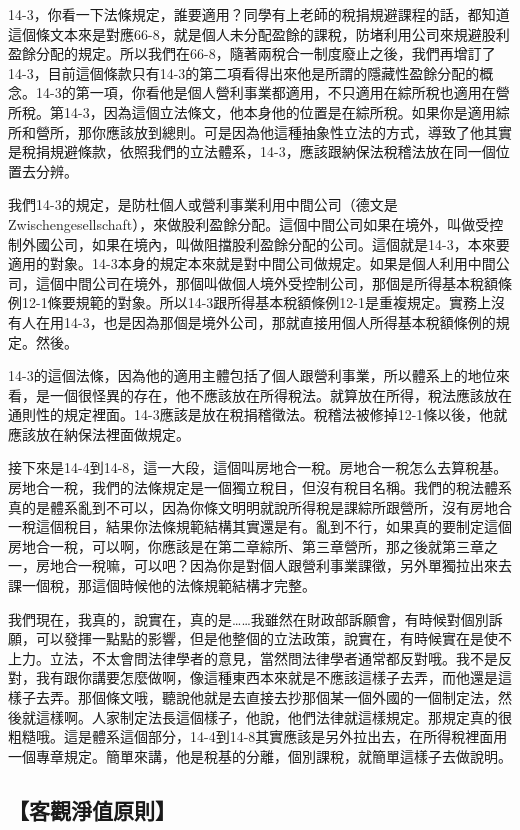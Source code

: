 \documentclass[oneside,sub3section]{ctexbook}
\begin{document}
14-3，你看一下法條規定，誰要適用？同學有上老師的稅捐規避課程的話，都知道這個條文本來是對應66-8，就是個人未分配盈餘的課稅，防堵利用公司來規避股利盈餘分配的規定。所以我們在66-8，隨著兩稅合一制度廢止之後，我們再增訂了14-3，目前這個條款只有14-3的第二項看得出來他是所謂的隱藏性盈餘分配的概念。14-3的第一項，你看他是個人營利事業都適用，不只適用在綜所稅也適用在營所稅。第14-3，因為這個立法條文，他本身他的位置是在綜所稅。如果你是適用綜所和營所，那你應該放到總則。可是因為他這種抽象性立法的方式，導致了他其實是稅捐規避條款，依照我們的立法體系，14-3，應該跟納保法稅稽法放在同一個位置去分辨。

我們14-3的規定，是防杜個人或營利事業利用中間公司（德文是Zwischengesellschaft），來做股利盈餘分配。這個中間公司如果在境外，叫做受控制外國公司，如果在境內，叫做阻擋股利盈餘分配的公司。這個就是14-3，本來要適用的對象。14-3本身的規定本來就是對中間公司做規定。如果是個人利用中間公司，這個中間公司在境外，那個叫做個人境外受控制公司，那個是所得基本稅額條例12-1條要規範的對象。所以14-3跟所得基本稅額條例12-1是重複規定。實務上沒有人在用14-3，也是因為那個是境外公司，那就直接用個人所得基本稅額條例的規定。然後。

14-3的這個法條，因為他的適用主體包括了個人跟營利事業，所以體系上的地位來看，是一個很怪異的存在，他不應該放在所得稅法。就算放在所得，稅法應該放在通則性的規定裡面。14-3應該是放在稅捐稽徵法。稅稽法被修掉12-1條以後，他就應該放在納保法裡面做規定。

接下來是14-4到14-8，這一大段，這個叫房地合一稅。房地合一稅怎么去算稅基。房地合一稅，我們的法條規定是一個獨立稅目，但沒有稅目名稱。我們的稅法體系真的是體系亂到不可以，因為你條文明明就說所得稅是課綜所跟營所，沒有房地合一稅這個稅目，結果你法條規範結構其實還是有。亂到不行，如果真的要制定這個房地合一稅，可以啊，你應該是在第二章綜所、第三章營所，那之後就第三章之一，房地合一稅嘛，可以吧？因為你是對個人跟營利事業課徵，另外單獨拉出來去課一個稅，那這個時候他的法條規範結構才完整。

我們現在，我真的，說實在，真的是\ldots\ldots 我雖然在財政部訴願會，有時候對個別訴願，可以發揮一點點的影響，但是他整個的立法政策，說實在，有時候實在是使不上力。立法，不太會問法律學者的意見，當然問法律學者通常都反對哦。我不是反對，我有跟你講要怎麼做啊，像這種東西本來就是不應該這樣子去弄，而他還是這樣子去弄。那個條文哦，聽說他就是去直接去抄那個某一個外國的一個制定法，然後就這樣啊。人家制定法長這個樣子，他說，他們法律就這樣規定。那規定真的很粗糙哦。這是體系這個部分，14-4到14-8其實應該是另外拉出去，在所得稅裡面用一個專章規定。簡單來講，他是稅基的分離，個別課稅，就簡單這樣子去做說明。

\hypertarget{ux5ba2ux89c0ux6de8ux503cux539fux5247-1}{%
\subsection{【客觀淨值原則】}\label{ux5ba2ux89c0ux6de8ux503cux539fux5247-1}}
\end{document}
